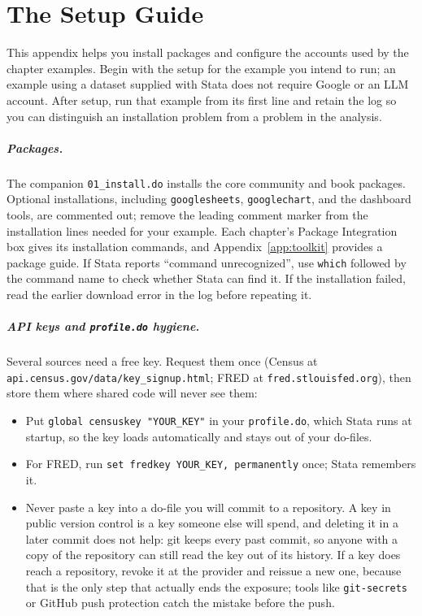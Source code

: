 \documentclass[
    a4paper,
    fontsize=10pt,
    twoside=true,
    numbers=noenddot,
]{kaobook}
\begin{document}

\appendix
{}

\chapter{The Setup Guide}\label{app:setup}
This appendix helps you install packages and configure the accounts used by the chapter examples. Begin with the setup for the example you intend to run; an example using a dataset supplied with Stata does not require Google or an LLM account. After setup, run that example from its first line and retain the log so you can distinguish an installation problem from a problem in the analysis.

\paragraph{Packages.} The companion \texttt{01\_install.do} installs the core community and book packages. Optional installations, including \texttt{googlesheets}, \texttt{googlechart}, and the dashboard tools, are commented out; remove the leading comment marker from the installation lines needed for your example. Each chapter's Package Integration box gives its installation commands, and Appendix~\ref{app:toolkit} provides a package guide. If Stata reports \enquote{command unrecognized}, use \texttt{which} followed by the command name to check whether Stata can find it. If the installation failed, read the earlier download error in the log before repeating it.

\paragraph{API keys and \texttt{profile.do} hygiene.} Several sources need a free key. Request them once (Census at \texttt{api.census.gov/data/key\_signup.html}; FRED at \texttt{fred.stlouisfed.org}), then store them where shared code will never see them:
\begin{itemize}
    \item Put \texttt{global censuskey "YOUR\_KEY"} in your \texttt{profile.do}, which Stata runs at startup, so the key loads automatically and stays out of your do-files.
    \item For FRED, run \texttt{set fredkey YOUR\_KEY, permanently} once; Stata remembers it.
    \item Never paste a key into a do-file you will commit to a repository. A key in public version control is a key someone else will spend, and deleting it in a later commit does not help: git keeps every past commit, so anyone with a copy of the repository can still read the key out of its history. If a key does reach a repository, revoke it at the provider and reissue a new one, because that is the only step that actually ends the exposure; tools like \texttt{git-secrets} or GitHub push protection catch the mistake before the push.
\end{itemize}
\end{document}
